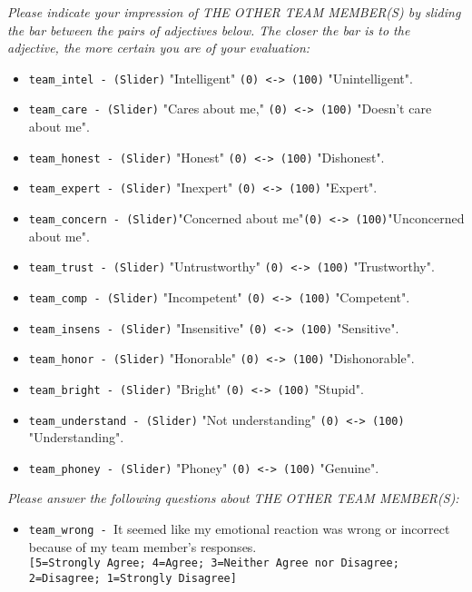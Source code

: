 \begin{description}
\begin{addmargin}[0em]{0em}
\begin{addmargin}[1em]{0em}
\begin{itemize}
        \end{itemize}
        \begin{addmargin}[1em]{0em}
            \textit{Please indicate your impression of THE OTHER TEAM MEMBER(S) by sliding the bar between the pairs of adjectives below. The closer the bar is to the adjective, the more certain you are of your evaluation:}
        \end{addmargin}
        \begin{itemize}
            \item \verb|team_intel - (Slider)| "Intelligent" \verb|(0) <-> (100)| "Unintelligent".
            \item \verb|team_care - (Slider)| "Cares about me," \verb|(0) <-> (100)| "Doesn't care about me".
            \item \verb|team_honest - (Slider)| "Honest" \verb|(0) <-> (100)| "Dishonest".
            \item \verb|team_expert - (Slider)| "Inexpert" \verb|(0) <-> (100)| "Expert".
            \item \verb|team_concern - (Slider)|"Concerned about me"\verb|(0) <-> (100)|"Unconcerned about me".
            \item \verb|team_trust - (Slider)| "Untrustworthy" \verb|(0) <-> (100)| "Trustworthy".
            \item \verb|team_comp - (Slider)| "Incompetent" \verb|(0) <-> (100)| "Competent".
            \item \verb|team_insens - (Slider)| "Insensitive" \verb|(0) <-> (100)| "Sensitive".
            \item \verb|team_honor - (Slider)| "Honorable" \verb|(0) <-> (100)| "Dishonorable".
            \item \verb|team_bright - (Slider)| "Bright" \verb|(0) <-> (100)| "Stupid".
            \item \verb|team_understand - (Slider)| "Not understanding" \verb|(0) <-> (100)| "Understanding".
            \item \verb|team_phoney - (Slider)| "Phoney" \verb|(0) <-> (100)| "Genuine".
        \end{itemize}
        \begin{addmargin}[1em]{0em}
            \textit{Please answer the following questions about THE OTHER TEAM MEMBER(S):}
        \end{addmargin}
        \begin{itemize}
            \item \verb|team_wrong - |It seemed like my emotional reaction was wrong or incorrect because of my team member's responses.\\\verb|[5=Strongly Agree; 4=Agree; 3=Neither Agree nor Disagree; 2=Disagree; 1=Strongly Disagree]|

\end{itemize}
\end{addmargin}
\end{addmargin}
\end{description}
